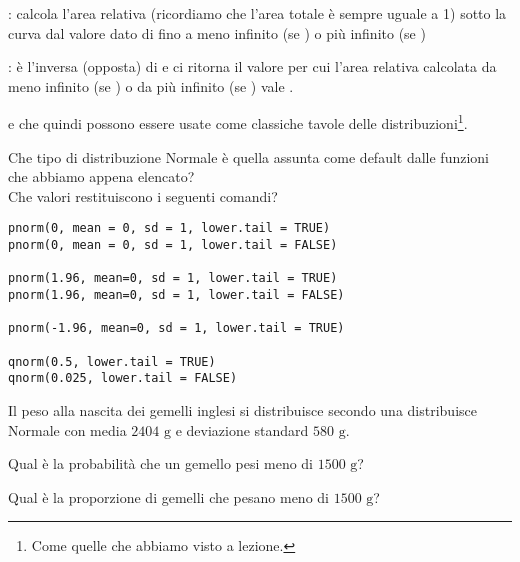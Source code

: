 \begin{myitemize}
	\item {}:  calcola l’area relativa (ricordiamo che l’area totale \`e sempre uguale a 1) sotto la curva dal valore dato di  fino a meno infinito (se ) o pi\`u infinito (se )
	\item {}: \`e l'inversa (opposta) di  e ci ritorna il valore per cui l'area relativa  calcolata da meno infinito (se ) o da pi\`u infinito (se ) vale .
\end{myitemize}
%
e che quindi possono essere usate come classiche tavole delle distribuzioni\footnote{Come quelle che abbiamo visto a lezione.}. 

\vspace{0.5cm} 

\begin{exercise}\label{ex5.1}

\noindent Che tipo di distribuzione Normale \`e quella assunta come default dalle funzioni che abbiamo appena elencato? \\

\noindent Che valori restituiscono i seguenti comandi?

\begin{lstlisting}[style=Rstyle]
pnorm(0, mean = 0, sd = 1, lower.tail = TRUE)
pnorm(0, mean = 0, sd = 1, lower.tail = FALSE)

pnorm(1.96, mean=0, sd = 1, lower.tail = TRUE)
pnorm(1.96, mean=0, sd = 1, lower.tail = FALSE)

pnorm(-1.96, mean=0, sd = 1, lower.tail = TRUE)

qnorm(0.5, lower.tail = TRUE)
qnorm(0.025, lower.tail = FALSE)
\end{lstlisting}

\end{exercise}


\vspace{0.5cm} 

\begin{exercise}\label{ex5.2}

\noindent Il peso alla nascita dei gemelli inglesi si distribuisce secondo una distribuisce Normale con media $2404 \text{ g}$ e deviazione standard $580 \text{ g}$. 

\begin{myitemize}
	\item Qual \`e la probabilit\`a che un gemello pesi meno di $1500 \text{ g}$?
	\item Qual \`e la proporzione di gemelli che pesano meno di $1500 \text{ g}$?
\end{myitemize}

\end{exercise}

